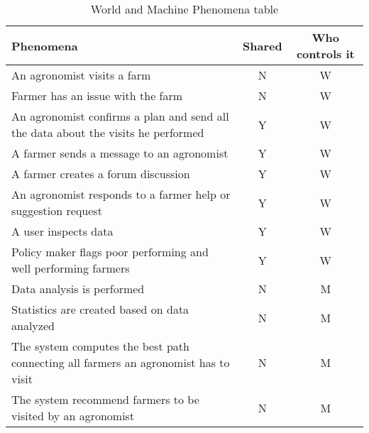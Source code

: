
\begin{table}[H]
\centering
\renewcommand{\arraystretch}{1.25}
\begin{tabular}{|p{}| c| c|}
\hline
\textbf{Phenomena}        & \textbf{Shared} & \textbf{Who controls it} \\ \hline

An agronomist visits a farm & N & W \\ \hline
Farmer has an issue with the farm & N & W \\ \hline
An agronomist confirms a plan and send all the data about the visits he performed  & Y & W \\ \hline
A farmer sends a message to an agronomist & Y &  W\\ \hline
A farmer creates a forum discussion & Y & W  \\ \hline
An agronomist responds to a farmer help or suggestion request & Y & W \\ \hline 
A user inspects data & Y & W \\ \hline
Policy maker flags poor performing and well performing farmers & Y & W \\ \hline

Data analysis is performed & N & M  \\ \hline
Statistics are created based on data analyzed  & N & M  \\ \hline
The system computes the best path connecting all farmers an agronomist has to visit  & N & M  \\ \hline
The system recommend farmers to be visited by an agronomist & N & M  \\ \hline
\end{tabular}

\caption{World and Machine Phenomena table}
\label{PhenomenaTable}
\end{table}
